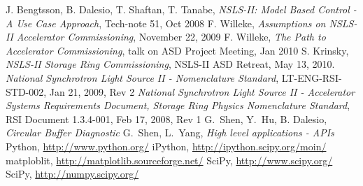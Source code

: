 \documentclass[11pt,oneside,letterpaper,showtrims,article]{memoir}
\begin{document}
\begin{thebibliography}{99}
 J. Bengtsson, B. Dalesio, T. Shaftan,
  T. Tanabe, \emph{NSLS-II: Model Based Control - A Use Case Approach},
  Tech-note 51, Oct 2008
 F. Willeke, \emph{Assumptions on
    NSLS-II Accelerator Commissioning}, November 22, 2009
 F. Willeke, \emph{The Path to Accelerator
    Commissioning}, talk on ASD Project Meeting, Jan 2010
 S. Krinsky, \emph{NSLS-II Storage Ring
    Commissioning}, NSLS-II ASD Retreat, May 13, 2010.
 \emph{National Synchrotron Light Source II
    - Nomenclature Standard}, LT-ENG-RSI-STD-002, Jan 21, 2009, Rev 2
 \emph{National Synchrotron Light Source II
    - Accelerator Systems Requirements Document, Storage Ring Physics
    Nomenclature Standard}, RSI Document 1.3.4-001, Feb 17, 2008, Rev 1
 G.~Shen, Y.~Hu, B. Dalesio, \emph{Circular Buffer
    Diagnostic}
 G.~Shen, L.~Yang, \emph{High level applications -
    APIs}
 Python, \url{http://www.python.org/}
 iPython, \url{http://ipython.scipy.org/moin/}
 matploblit, \url{http://matplotlib.sourceforge.net/}
 SciPy, \url{http://www.scipy.org/}
 SciPy, \url{http://numpy.scipy.org/}
\end{thebibliography}

%
%

\pagestyle{index}
\printindex
\end{document}
